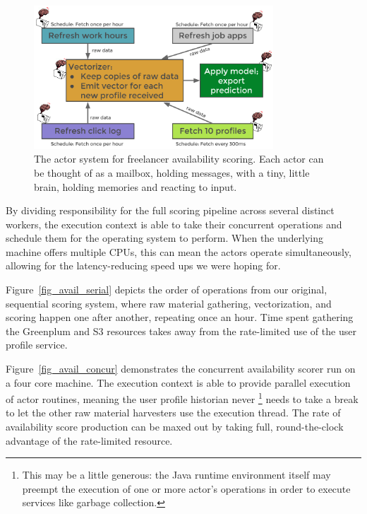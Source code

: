 \documentclass{article}
\begin{document}
\begin{figure}[h]
\includegraphics[width=0.8\textwidth]{fig/tex/availability_system.png}
\centering
\caption{The actor system for freelancer availability scoring. Each actor can be thought of
as a mailbox, holding messages, with a tiny, little brain, holding memories and reacting to 
input.}
\label{fig_av_system}
\end{figure}

By dividing responsibility for the full scoring pipeline across several distinct workers,
the execution context is able to take their concurrent operations and schedule them
for the operating system to perform. When the underlying machine offers multiple
CPUs, this can mean the actors operate simultaneously, allowing for the 
latency-reducing speed ups we were hoping for. 

Figure~\ref{fig_avail_serial} depicts the order of operations from our original,
sequential scoring system, where raw material gathering, vectorization, and
scoring happen one after another, repeating once an hour. Time spent gathering
the Greenplum and S3 resources takes away from the rate-limited use of
the user profile service.

Figure~\ref{fig_avail_concur} demonstrates the concurrent availability scorer
run on a four core machine. The execution context is able to provide parallel
execution of actor routines, meaning the user profile historian never \footnote{
This may be a little generous: the Java runtime environment itself may preempt
the execution of one or more actor's operations in order to execute services like
garbage collection.} needs to take a break to let the other raw material harvesters 
use the execution thread. The rate of availability score production can be maxed out 
by taking full, round-the-clock advantage of the rate-limited resource.
\end{document}
